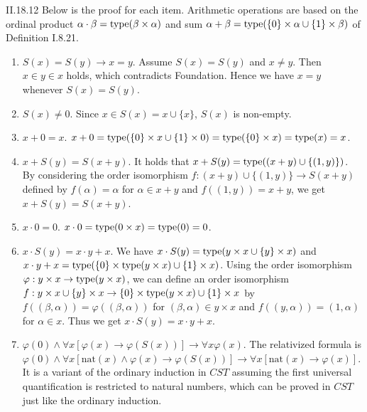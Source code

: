 \documentclass[12pt]{article}
\begin{document}
\begin{customthm}{II.18.12} Below is the proof for each item. Arithmetic operations are based on the ordinal product $\alpha\cdot\beta=\mathop{\mathrm{type}}(\beta\times\alpha)$ and sum $\alpha+\beta=\mathop{\mathrm{type}}(\{0\}\times\alpha\cup\{1\}\times\beta)$ of Definition I.8.21.
  \begin{enumerate}[label=\alph*.]
    \item\underline{$S(x)=S(y)\rightarrow x=y$}. Assume $S(x)=S(y)$ and $x\neq y$. Then $x\in y\in x$ holds, which contradicts Foundation. Hence we have $x=y$ whenever $S(x)=S(y)$.
    \item\underline{$S(x)\neq 0$}. Since $x\in S(x)=x\cup\{x\}$, $S(x)$ is non-empty.
    \item\underline{$x+0=x$}. $x+0=\mathop{\mathrm{type}}(\{0\}\times x\cup\{1\}\times 0)=\mathop{\mathrm{type}}(\{0\}\times x)=\mathop{\mathrm{type}}(x)=x$.
    \item\underline{$x+S(y)=S(x+y)$}. It holds that $x+S(y)=\mathop{\mathrm{type}}((x+y)\cup\{(1,y)\})$. By considering the order isomorphism $f:(x+y)\cup\{(1,y)\}\rightarrow S(x+y)$ defined by $f(\alpha)=\alpha$ for $\alpha\in x+y$ and $f((1,y))=x+y$, we get $x+S(y)=S(x+y)$.
    \item\underline{$x\cdot 0=0$}. $x\cdot 0=\mathop{\mathrm{type}}(0\times x)=\mathop{\mathrm{type}}(0)=0$.
    \item\underline{$x\cdot S(y)=x\cdot y+x$}. We have $x\cdot S(y)=\mathop{\mathrm{type}}(y\times x\cup\{y\}\times x)$ and $x\cdot y+x=\mathop{\mathrm{type}}(\{0\}\times \mathop{\mathrm{type}}(y\times x)\cup\{1\}\times x)$. Using the order isomorphism $\varphi:y\times x\rightarrow\mathop{\mathrm{type}}(y\times x)$, we can define an order isomorphism $f:y\times x\cup\{y\}\times x\rightarrow\{0\}\times \mathop{\mathrm{type}}(y\times x)\cup\{1\}\times x$ by $f((\beta,\alpha))=\varphi((\beta,\alpha))$ for $(\beta,\alpha)\in y\times x$ and $f((y,\alpha))=(1,\alpha)$ for $\alpha\in x$. Thus we get $x\cdot S(y)=x\cdot y+x$.
    \item\underline{$\varphi(0)\wedge\forall x[\varphi(x)\rightarrow\varphi(S(x))]\rightarrow\forall x\varphi(x)$}. The relativized formula is $\varphi(0)\wedge\forall x[\mathrm{nat}(x)\wedge\varphi(x)\rightarrow\varphi(S(x))]\rightarrow\forall x[\mathrm{nat}(x)\rightarrow\varphi(x)]$. It is a variant of the ordinary induction in $CST$ assuming the first universal quantification is restricted to natural numbers, which can be proved in $CST$ just like the ordinary induction.
  \end{enumerate}
\end{customthm}
\end{document}

